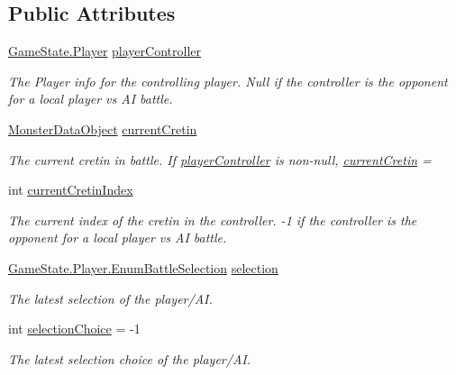 \subsection*{Public Attributes}
\begin{DoxyCompactItemize}
\item 
\hyperlink{class_game_state_1_1_player}{Game\-State.\-Player} \hyperlink{class_battle_participant_a2f1584b2283c99eaaaa8e5b66ced968f}{player\-Controller}
\begin{DoxyCompactList}\small\item\em The Player info for the controlling player. Null if the controller is the opponent for a local player vs A\-I battle. \end{DoxyCompactList}\item 
\hyperlink{class_monster_data_object}{Monster\-Data\-Object} \hyperlink{class_battle_participant_a595abdc8d0d62918b99b37ea9d948d00}{current\-Cretin}
\begin{DoxyCompactList}\small\item\em The current cretin in battle. If \hyperlink{class_battle_participant_a2f1584b2283c99eaaaa8e5b66ced968f}{player\-Controller} is non-\/null, \hyperlink{class_battle_participant_a595abdc8d0d62918b99b37ea9d948d00}{current\-Cretin} = \end{DoxyCompactList}\item 
int \hyperlink{class_battle_participant_a1ad2e6be9469ff3c433be70fc6245484}{current\-Cretin\-Index}
\begin{DoxyCompactList}\small\item\em The current index of the cretin in the controller. -\/1 if the controller is the opponent for a local player vs A\-I battle. \end{DoxyCompactList}\item 
\hyperlink{class_game_state_1_1_player_a9f54c5eca1e60acbaa2074e981f51615}{Game\-State.\-Player.\-Enum\-Battle\-Selection} \hyperlink{class_battle_participant_abf036cb064ddcd97270c1b9ed8442f50}{selection}
\begin{DoxyCompactList}\small\item\em The latest selection of the player/\-A\-I. \end{DoxyCompactList}\item 
int \hyperlink{class_battle_participant_a30032b373a898bbb16f67e24bf245557}{selection\-Choice} = -\/1
\begin{DoxyCompactList}\small\item\em The latest selection choice of the player/\-A\-I. \end{DoxyCompactList}\end{DoxyCompactItemize}


